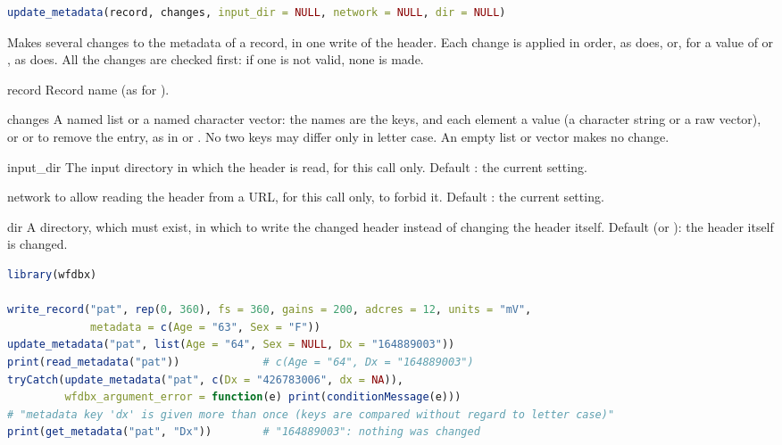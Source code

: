 \begin{lstlisting}[language=R,style=signature]
update_metadata(record, changes, input_dir = NULL, network = NULL, dir = NULL)
\end{lstlisting}
Makes several changes to the metadata of a record, in one write of the header. Each
change is applied in order, as  does, or, for a value of 
or , as  does. All the changes are checked first: if one
is not valid, none is made.
\begin{params}
\item[record] Record name (as for ).
\item[changes] A named list or a named character vector: the names are the keys, and each
  element a value (a character string or a raw vector), or  or  to
  remove the entry, as in  or . No two keys may differ only in letter case. An empty list or vector makes no
  change.
\item[input\_dir] The input directory in which the header is read, for this call only.
  Default : the current setting.
\item[network]  to allow reading the header from a URL, for this call only,
   to forbid it. Default : the current setting.
\item[dir] A directory, which must exist, in which to write the changed header instead of
  changing the header itself. Default  (or ): the header itself is
  changed.
\end{params}
\begin{lstlisting}[language=R,style=example]
library(wfdbx)

write_record("pat", rep(0, 360), fs = 360, gains = 200, adcres = 12, units = "mV",
             metadata = c(Age = "63", Sex = "F"))
update_metadata("pat", list(Age = "64", Sex = NULL, Dx = "164889003"))
print(read_metadata("pat"))             # c(Age = "64", Dx = "164889003")
tryCatch(update_metadata("pat", c(Dx = "426783006", dx = NA)),
         wfdbx_argument_error = function(e) print(conditionMessage(e)))
# "metadata key 'dx' is given more than once (keys are compared without regard to letter case)"
print(get_metadata("pat", "Dx"))        # "164889003": nothing was changed
\end{lstlisting}

